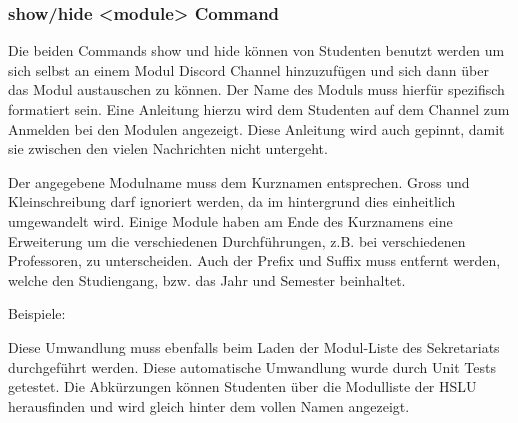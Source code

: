 \documentclass[a4paper, table]{article}
\begin{document}
\subsubsection{show/hide <module> Command}

Die beiden Commands show und hide können von Studenten benutzt werden um sich selbst an einem Modul Discord Channel hinzuzufügen und sich dann über das Modul austauschen zu können.
Der Name des Moduls muss hierfür spezifisch formatiert sein.
Eine Anleitung hierzu wird dem Studenten auf dem Channel zum Anmelden bei den Modulen angezeigt.
Diese Anleitung wird auch gepinnt, damit sie zwischen den vielen Nachrichten nicht untergeht.

Der angegebene Modulname muss dem Kurznamen entsprechen.
Gross und Kleinschreibung darf ignoriert werden, da im hintergrund dies einheitlich umgewandelt wird.
Einige Module haben am Ende des Kurznamens eine Erweiterung um die verschiedenen Durchführungen, z.B. bei verschiedenen Professoren, zu unterscheiden.
Auch der Prefix und Suffix muss entfernt werden, welche den Studiengang, bzw. das Jahr und Semester beinhaltet.

Beispiele:


Diese Umwandlung muss ebenfalls beim Laden der Modul-Liste des Sekretariats durchgeführt werden.
Diese automatische Umwandlung wurde durch Unit Tests getestet. 
Die Abkürzungen können Studenten über die Modulliste der HSLU herausfinden und wird gleich hinter dem vollen Namen angezeigt.\autocite{noauthor_bachelor_nodate}
\end{document}
